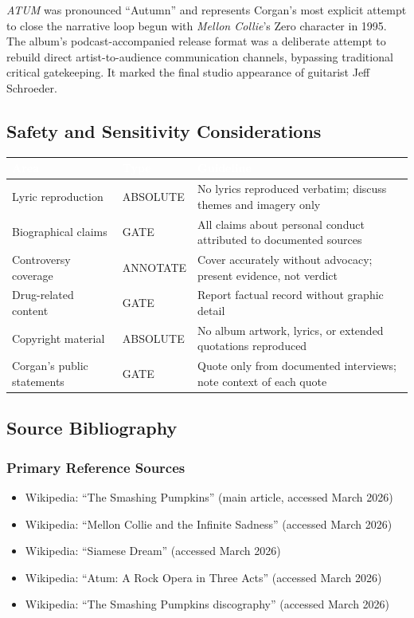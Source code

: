 \documentclass[11pt,letterpaper]{article}
\newcommand{\tableheader}[1]{\textbf{\sffamily\textcolor{white}{#1}}}
\begin{document}
\textit{ATUM} was pronounced ``Autumn'' and represents Corgan's most explicit attempt to close the narrative loop begun with \textit{Mellon Collie}'s Zero character in 1995. The album's podcast-accompanied release format was a deliberate attempt to rebuild direct artist-to-audience communication channels, bypassing traditional critical gatekeeping. It marked the final studio appearance of guitarist Jeff Schroeder.

\subsection{Safety and Sensitivity Considerations}

\begin{center}
\begin{tabularx}{\textwidth}{L{3.5cm}L{2cm}X}
\toprule
{}
\tableheader{Area} & \tableheader{Type} & \tableheader{Guideline} \\
\midrule
Lyric reproduction & ABSOLUTE & No lyrics reproduced verbatim; discuss themes and imagery only \\
Biographical claims & GATE & All claims about personal conduct attributed to documented sources \\
Controversy coverage & ANNOTATE & Cover accurately without advocacy; present evidence, not verdict \\
Drug-related content & GATE & Report factual record without graphic detail \\
Copyright material & ABSOLUTE & No album artwork, lyrics, or extended quotations reproduced \\
Corgan's public statements & GATE & Quote only from documented interviews; note context of each quote \\
\bottomrule
\end{tabularx}
\end{center}

\subsection{Source Bibliography}

\subsubsection{Primary Reference Sources}

\begin{itemize}
  \item Wikipedia: ``The Smashing Pumpkins'' (main article, accessed March 2026)
  \item Wikipedia: ``Mellon Collie and the Infinite Sadness'' (accessed March 2026)
  \item Wikipedia: ``Siamese Dream'' (accessed March 2026)
  \item Wikipedia: ``Atum: A Rock Opera in Three Acts'' (accessed March 2026)
  \item Wikipedia: ``The Smashing Pumpkins discography'' (accessed March 2026)
\end{itemize}
\end{document}
